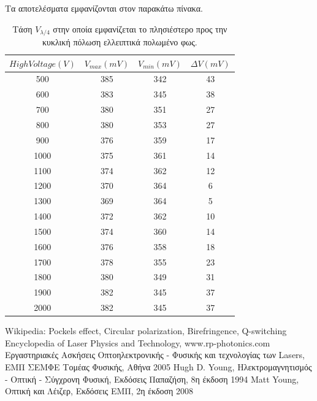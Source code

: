 \documentclass[a4paper,11pt,titlepage]{article}
\begin{document}
Τα αποτελέσματα εμφανίζονται στον παρακάτω πίνακα.

\begin{table} [!hbp]
\centering
\begin{tabular}{|c|c|c|c|}
\hline \rule[-2ex]{0pt}{5.5ex} $High Voltage (V)$ & $V_{max} (mV)$ & $V_{min} (mV)$ & $ΔV (mV)$ \\ 
\hline \rule[-2ex]{0pt}{5.5ex} 500 & 385 & 342 & 43 \\ 
\hline \rule[-2ex]{0pt}{5.5ex} 600 & 383 & 345 & 38 \\ 
\hline \rule[-2ex]{0pt}{5.5ex} 700 & 380 & 351 & 27\\ 
\hline \rule[-2ex]{0pt}{5.5ex} 800 & 380 & 353 & 27 \\ 
\hline \rule[-2ex]{0pt}{5.5ex} 900 & 376 & 359 & 17 \\ 
\hline \rule[-2ex]{0pt}{5.5ex} 1000 & 375 & 361 & 14 \\ 
\hline \rule[-2ex]{0pt}{5.5ex} 1100 & 374 & 362 & 12 \\ 
\hline \rule[-2ex]{0pt}{5.5ex} 1200 & 370 & 364 & 6 \\ 
\hline \rule[-2ex]{0pt}{5.5ex} 1300 & 369 & 364 & 5 \\ 
\hline \rule[-2ex]{0pt}{5.5ex} 1400 & 372 & 362 & 10 \\ 
\hline \rule[-2ex]{0pt}{5.5ex} 1500 & 374 & 360 & 14 \\ 
\hline \rule[-2ex]{0pt}{5.5ex} 1600 & 376 & 358 & 18 \\ 
\hline \rule[-2ex]{0pt}{5.5ex} 1700 & 378 & 355 & 23 \\ 
\hline \rule[-2ex]{0pt}{5.5ex} 1800 & 380 & 349 & 31 \\ 
\hline \rule[-2ex]{0pt}{5.5ex} 1900 & 382 & 345 & 37 \\ 
\hline \rule[-2ex]{0pt}{5.5ex} 2000 & 382 & 345 & 37 \\ 
\hline 
\end{tabular} 
\caption{Τάση $V_{\lambda/4}$ στην οποία εμφανίζεται το πλησιέστερο προς την κυκλική πόλωση ελλειπτικά πολωμένο φως.}
\end{table}

\newpage



\begin{thebibliography}{9}

  Wikipedia: Pockels effect, Circular polarization, Birefringence, Q-switching
 Encyclopedia of Laser Physics and Technology, www.rp-photonics.com
 Εργαστηριακές Ασκήσεις Οπτοηλεκτρονικής - Φυσικής και τεχνολογίας των Lasers, ΕΜΠ ΣΕΜΦΕ Τομέας Φυσικής, Αθήνα 2005
  Hugh D. Young, Ηλεκτρομαγνητισμός - Οπτική - Σύγχρονη Φυσική, Εκδόσεις Παπαζήση, 8η έκδοση 1994 
 Matt Young, Οπτική και Λέιζερ, Εκδόσεις ΕΜΠ, 2η έκδοση 2008 

\end{thebibliography}
\end{document}
